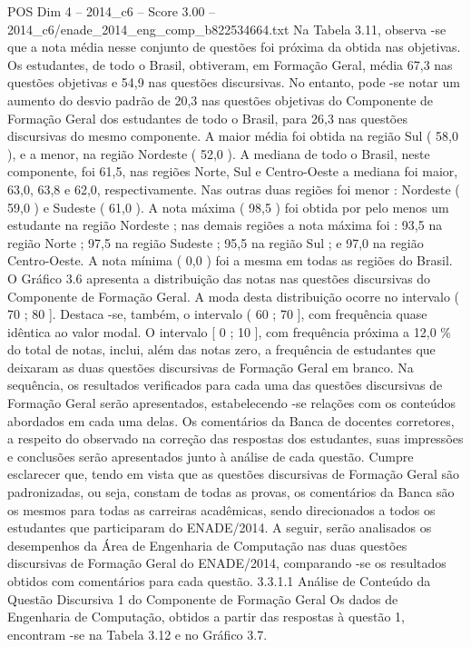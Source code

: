 \begin{textsample}{POS Dim 4 – 2014\_c6 – Score 3.00 – 2014\_c6/enade\_2014\_eng\_comp\_b822534664.txt}
Na Tabela 3.11, observa -se que a nota média nesse conjunto de questões foi próxima da obtida nas objetivas.
Os estudantes, de todo o Brasil, obtiveram, em Formação Geral, média 67,3 nas questões objetivas e 54,9 nas questões discursivas.
No entanto, pode -se notar um aumento do desvio padrão de 20,3 nas questões objetivas do Componente de Formação Geral dos estudantes de todo o Brasil, para 26,3 nas questões discursivas do mesmo componente.
A maior média foi obtida na região Sul ( 58,0 ), e a menor, na região Nordeste ( 52,0 ).
A mediana de todo o Brasil, neste componente, foi 61,5, nas regiões Norte, Sul e Centro-Oeste a mediana foi maior, 63,0, 63,8 e 62,0, respectivamente.
Nas outras duas regiões foi menor : Nordeste ( 59,0 ) e Sudeste ( 61,0 ).
A nota máxima ( 98,5 ) foi obtida por pelo menos um estudante na região Nordeste ; nas demais regiões a nota máxima foi : 93,5 na região Norte ; 97,5 na região Sudeste ; 95,5 na região Sul ; e 97,0 na região Centro-Oeste.
A nota mínima ( 0,0 ) foi a mesma em todas as regiões do Brasil.
O Gráfico 3.6 apresenta a distribuição das notas nas questões discursivas do Componente de Formação Geral.
A moda desta distribuição ocorre no intervalo ( 70 ; 80 ].
Destaca -se, também, o intervalo ( 60 ; 70 ], com frequência quase idêntica ao valor modal.
O intervalo [ 0 ; 10 ], com frequência próxima a 12,0 \% do total de notas, inclui, além das notas zero, a frequência de estudantes que deixaram as duas questões discursivas de Formação Geral em branco.
Na sequência, os resultados verificados para cada uma das questões discursivas de Formação Geral serão apresentados, estabelecendo -se relações com os conteúdos abordados em cada uma delas.
Os comentários da Banca de docentes corretores, a respeito do observado na correção das respostas dos estudantes, suas impressões e conclusões serão apresentados junto à análise de cada questão.
Cumpre esclarecer que, tendo em vista que as questões discursivas de Formação Geral são padronizadas, ou seja, constam de todas as provas, os comentários da Banca são os mesmos para todas as carreiras acadêmicas, sendo direcionados a todos os estudantes que participaram do ENADE/2014.
A seguir, serão analisados os desempenhos da Área de Engenharia de Computação nas duas questões discursivas de Formação Geral do ENADE/2014, comparando -se os resultados obtidos com comentários para cada questão. 3.3.1.1 Análise de Conteúdo da Questão Discursiva 1 do Componente de Formação Geral Os dados de Engenharia de Computação, obtidos a partir das respostas à questão 1, encontram -se na Tabela 3.12 e no Gráfico 3.7.

\end{textsample}
